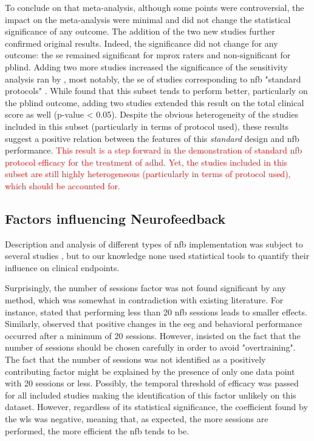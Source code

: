 To conclude on that meta-analysis, although some points were controversial, the impact on the
meta-analysis were minimal and did not change the statistical significance of any outcome. 
The addition of the two new studies \citep{Strehl2017, Baumeister2016} further confirmed original results. Indeed, the
significance did not change for any outcome: the \gls{se} remained significant for \gls{mprox} raters and
non-significant for \gls{pblind}. Adding two more studies increased the significance of the sensitivity analysis ran by
\citeauthor{Cortese2016}, most notably, the \gls{se} of studies corresponding to \gls{nfb} "standard protocols" \citep{Arns2014}. 
While \citeauthor{Cortese2016} found that this subset tends to perform better, particularly on the \gls{pblind} outcome, 
adding two studies extended this result on the total clinical score as well (p-value < 0.05). Despite the obvious heterogeneity 
of the studies included in this subset (particularly in terms of protocol used), these results suggest a positive relation 
between the features of this \emph{standard} design and \gls{nfb} performance. \textcolor{red}{This result is a step forward in the demonstration 
of standard \gls{nfb} protocol efficacy for the treatment of \gls{adhd}. Yet, the  studies 
included in this subset are still highly heterogeneous (particularly in terms of protocol used), which should be accounted for.}


\subsection{Factors influencing Neurofeedback}

Description and analysis of different types of \gls{nfb} implementation was subject to several studies \citep{Arns2014, 
Enriquez2017, Vernon2004, Jeunet2018}, but to our knowledge none used statistical tools to quantify their influence on
clinical endpoints. 

Surprisingly, the number of sessions factor was not found significant by any method, which was somewhat
in contradiction with existing literature. For instance, \citet{Arns2014} stated that performing less than
20 \gls{nfb} sessions leads to smaller effects. Similarly, \citet{Vernon2004} observed that positive changes in the \gls{eeg}
and behavioral performance occurred after a minimum of 20 sessions. However, \citet{Enriquez2017} insisted on the fact that the number of
sessions should be chosen carefully in order to avoid "overtraining". The fact that the number of sessions was not identified as a 
positively contributing factor might be explained by the presence of only one data point with 20 sessions or less. Possibly, 
the temporal threshold of efficacy was passed for all included studies making the identification of this factor unlikely on 
this dataset. However, regardless of its statistical significance, the coefficient found by the \gls{wls} was negative, meaning 
that, as expected, the more sessions are performed, the more efficient the \gls{nfb} tends to be. 

